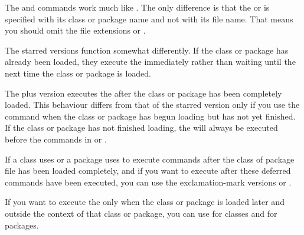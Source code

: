 \begin{Declaration}
\end{Declaration}%
The  and  commands work much like
. The only difference is that the
 or  is specified with its class or package name
and not with its file name. That means you should omit the file extensions
 or .

The starred versions
function somewhat differently. If the class or package has already been
loaded, they execute the  immediately rather than waiting
until the next time the class or package is loaded.

The
plus version executes the
 after the class or package has been completely loaded. This
behaviour differs from that of the starred version only if you use the command
when the class or package has begun loading but has not yet finished. If the
class or package has not finished loading, the  will always be
executed before the commands in  or
.

If a class uses
 or a package uses  to execute
commands after the class of package file has been loaded completely, and
if you want to execute  after these deferred
commands have been executed, you can use the exclamation-mark versions
 or
.

If you
want to execute the  only when the class or package is loaded
later and outside the context of that class or package, you can use
 for classes and
 for packages.

